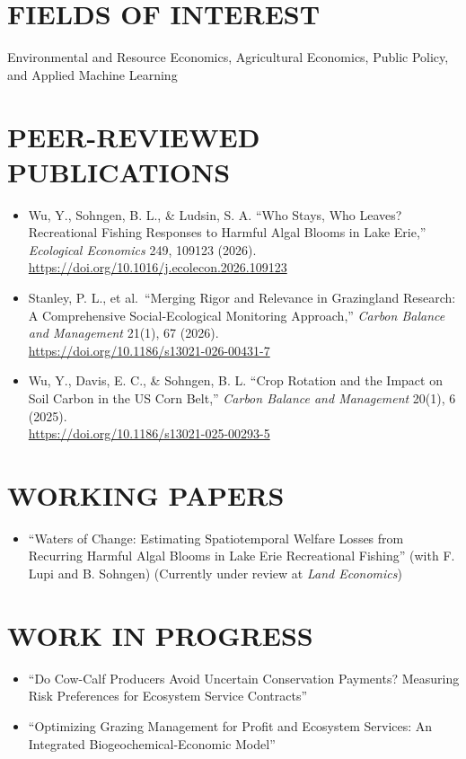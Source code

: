 \documentclass[letterpaper,10pt]{article}
\begin{document}
\section{FIELDS OF INTEREST}
Environmental and Resource Economics, Agricultural Economics, Public Policy, and Applied Machine Learning

\section{PEER-REVIEWED PUBLICATIONS}
\begin{itemize}[leftmargin=1em, itemsep=4pt, parsep=0pt, topsep=3pt]
    \item Wu, Y., Sohngen, B. L., \& Ludsin, S. A. ``Who Stays, Who Leaves? Recreational Fishing Responses to Harmful Algal Blooms in Lake Erie,'' \textit{Ecological Economics} 249, 109123 (2026). \\
    \href{https://doi.org/10.1016/j.ecolecon.2026.109123}{https://doi.org/10.1016/j.ecolecon.2026.109123}
    \item Stanley, P. L., et al.\ ``Merging Rigor and Relevance in Grazingland Research: A Comprehensive Social-Ecological Monitoring Approach,'' \textit{Carbon Balance and Management} 21(1), 67 (2026). \\
    \href{https://doi.org/10.1186/s13021-026-00431-7}{https://doi.org/10.1186/s13021-026-00431-7}
    \item Wu, Y., Davis, E. C., \& Sohngen, B. L. ``Crop Rotation and the Impact on Soil Carbon in the US Corn Belt,'' \textit{Carbon Balance and Management} 20(1), 6 (2025). \\
    \href{https://doi.org/10.1186/s13021-025-00293-5}{https://doi.org/10.1186/s13021-025-00293-5}
\end{itemize}

\section{WORKING PAPERS}
\begin{itemize}[leftmargin=1em, itemsep=3pt, parsep=0pt, topsep=3pt]
    \item ``Waters of Change: Estimating Spatiotemporal Welfare Losses from Recurring Harmful Algal Blooms in Lake Erie Recreational Fishing'' (with F. Lupi and B. Sohngen) (Currently under review at \textit{Land Economics})
\end{itemize}

\section{WORK IN PROGRESS}
\begin{itemize}[leftmargin=1em, itemsep=3pt, parsep=0pt, topsep=3pt]
    \item ``Do Cow-Calf Producers Avoid Uncertain Conservation Payments? Measuring Risk Preferences for Ecosystem Service Contracts''
    \item ``Optimizing Grazing Management for Profit and Ecosystem Services: An Integrated Biogeochemical-Economic Model''
\end{itemize}
\end{document}
